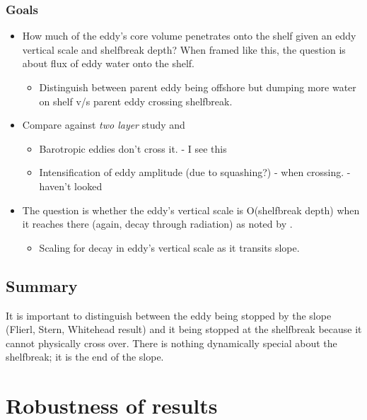 \subsubsection*{Goals}
\label{sec-5-2-1}
\begin{itemize}
\item How much of the eddy's core volume penetrates onto the shelf given an eddy vertical scale and shelfbreak depth? When framed like this, the question is about flux of eddy water onto the shelf.
\begin{itemize}
\item Distinguish between parent eddy being offshore but dumping more water on shelf v/s parent eddy crossing shelfbreak.
\end{itemize}
\item Compare against \emph{two layer} \citet{Kamenkovich1996} study and \citet{Adams2010}
\begin{itemize}
\item Barotropic eddies don't cross it. - I see this
\item Intensification of eddy amplitude (due to squashing?) - when crossing. - haven't looked
\end{itemize}
\item The question is whether the eddy's vertical scale is O(shelfbreak depth) when it reaches there (again, decay through radiation) as noted by \cite{Beismann1999}.
\begin{itemize}
\item Scaling for decay in eddy's vertical scale as it transits slope.
\end{itemize}
\end{itemize}
\subsection{Summary}
\label{sec-5-3}
It is important to distinguish between the eddy being stopped by the slope (Flierl, Stern, Whitehead result) and it being stopped at the shelfbreak because it cannot physically cross over. There is nothing dynamically special about the shelfbreak; it is the end of the slope.
\section{Robustness of results}
\label{sec-6}
